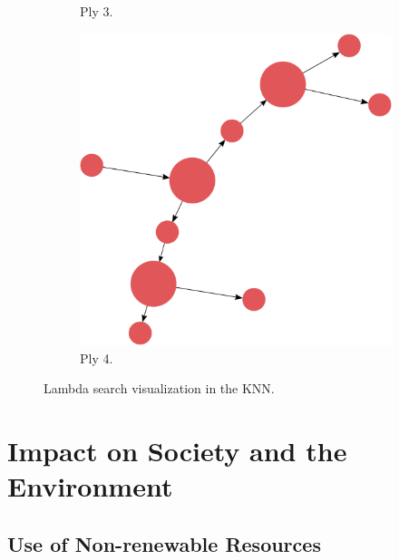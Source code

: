 \documentclass[titlepage,11pt]{article}
\begin{document}
\begin{figure}[!htb]
\begin{subfigure}[!htb]{0.19\textwidth}
		\caption{Ply 3.}
	\end{subfigure}
	\begin{subfigure}[!htb]{0.19\textwidth}
		\centering
		\includegraphics[width=\columnwidth]{figures/knn_simple_lambda_think_4.pdf}
		\caption{Ply 4.}
	\end{subfigure}
	\caption{Lambda search visualization in the KNN.}
	\label{fig:lambda_search_test}
\end{figure} 

\section{Impact on Society and the Environment}
\label{sec:impact}


\subsection{Use of Non-renewable Resources}
\end{document}
